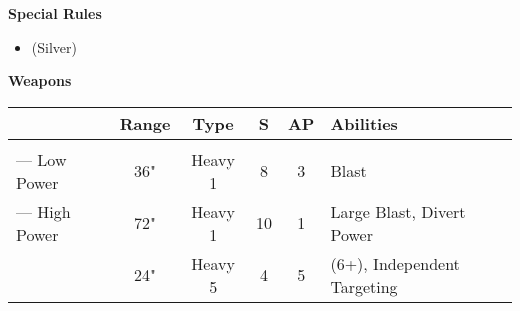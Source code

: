 \begin{minipage}[t]{0.72\textwidth}
\begin{minipage}[t]{0.5\textwidth}
\begin{flushleft}
			\textbf{Special Rules}
			\begin{itemize}
				\item {} (Silver)
			\end{itemize}
		\end{flushleft}
	\end{minipage}
	
	\vspace*{2em}
	\textbf{Weapons}
	
	\begin{tabular}{m{95 pt} *{4}{c} >{\raggedright\arraybackslash}p{130pt}}
		& Range & Type & S & AP & Abilities \\
		\hline
		\quickref{Doomsday Cannon} & & & & & \\
		— Low Power & 36" & Heavy 1 & 8 & 3 & Blast \\
		— High Power & 72" & Heavy 1 & 10 & 1 & Large Blast, Divert Power \\
		\quickref{Gauss Flayer Array} & 24" & Heavy 5 & 4 & 5 & \quickref{Gauss} (6+), Independent Targeting \\
	\end{tabular}
\end{minipage}
